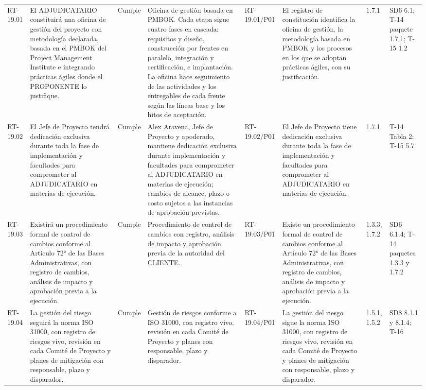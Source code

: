 \documentclass[oficio,firma,final]{lafrox}
\begin{document}
\begin{landscape}
{\begin{longtable}{@{}F{0.054} F{0.173} F{0.061} F{0.191} F{0.106} F{0.180} F{0.067} F{0.168}@{}}
  RT-19.01 & El ADJUDICATARIO constituirá una oficina de gestión del proyecto con metodología declarada, basada en el PMBOK del Project Management Institute e integrando prácticas ágiles donde el PROPONENTE lo justifique. & Cumple & Oficina de gestión basada en PMBOK. Cada etapa sigue cuatro fases en cascada: requisitos y diseño, construcción por frentes en paralelo, integración y certificación, e implantación. La oficina hace seguimiento de las actividades y los entregables de cada frente según las líneas base y los hitos de aceptación. & RT-19.01/\allowbreak{}P01 & El registro de constitución identifica la oficina de gestión, la metodología basada en PMBOK y los procesos en los que se adoptan prácticas ágiles, con su justificación. & 1.7.1 & SD6 6.1; T-14 paquete 1.7.1; T-15 1.2  \\
  RT-19.02 & El Jefe de Proyecto tendrá dedicación exclusiva durante toda la fase de implementación y facultades para comprometer al ADJUDICATARIO en materias de ejecución. & Cumple & Alex Aravena, Jefe de Proyecto y apoderado, mantiene dedicación exclusiva durante implementación y facultades para comprometer al ADJUDICATARIO en materias de ejecución; cambios de alcance, plazo o costo sujetos a las instancias de aprobación previstas. & RT-19.02/\allowbreak{}P01 & El Jefe de Proyecto tiene dedicación exclusiva durante toda la fase de implementación y facultades para comprometer al ADJUDICATARIO en materias de ejecución. & 1.7.1 & T-14 Tabla 2; T-15 5.7  \\
  RT-19.03 & Existirá un procedimiento formal de control de cambios conforme al Artículo 72° de las Bases Administrativas, con registro de cambios, análisis de impacto y aprobación previa a la ejecución. & Cumple & Procedimiento de control de cambios con registro, análisis de impacto y aprobación previa de la autoridad del CLIENTE. & RT-19.03/\allowbreak{}P01 & Existe un procedimiento formal de control de cambios conforme al Artículo 72° de las Bases Administrativas, con registro de cambios, análisis de impacto y aprobación previa a la ejecución. & 1.3.3, 1.7.2 & SD6 6.1.4; T-14 paquetes 1.3.3 y 1.7.2  \\
  RT-19.04 & La gestión del riesgo seguirá la norma ISO 31000, con registro de riesgos vivo, revisión en cada Comité de Proyecto y planes de mitigación con responsable, plazo y disparador. & Cumple & Gestión de riesgos conforme a ISO 31000, con registro vivo, revisión en cada Comité de Proyecto y planes con responsable, plazo y disparador. & RT-19.04/\allowbreak{}P01 & La gestión del riesgo sigue la norma ISO 31000, con registro de riesgos vivo, revisión en cada Comité de Proyecto y planes de mitigación con responsable, plazo y disparador. & 1.5.1, 1.5.2 & SD8 8.1.1 y 8.1.4; T-16  \\

\end{longtable}}
\end{landscape}
\end{document}
